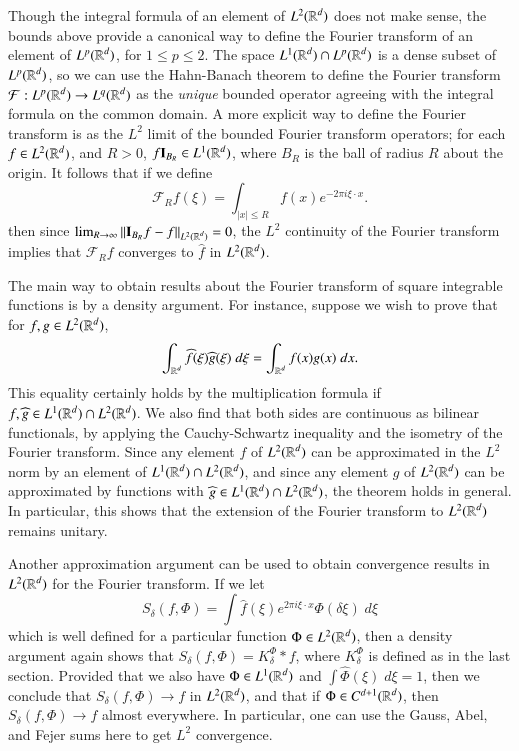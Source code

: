 Though the integral formula of an element of $L^2(\operatorname{\mathbb{R}}^d)$ does not make sense, the bounds above provide a canonical way to define the Fourier transform of an element of $L^p(\operatorname{\mathbb{R}}^d)$, for $1 \leq p \leq 2$. The space $L^1(\operatorname{\mathbb{R}}^d) \cap L^p(\operatorname{\mathbb{R}}^d)$ is a dense subset of $L^p(\operatorname{\mathbb{R}}^d)$, so we can use the Hahn-Banach theorem to define the Fourier transform $\mathcal{F}: L^p(\operatorname{\mathbb{R}}^d) \to L^q(\operatorname{\mathbb{R}}^d)$ as the {\it unique} bounded operator agreeing with the integral formula on the common domain. A more explicit way to define the Fourier transform is as the $L^2$ limit of the bounded Fourier transform operators; for each $f \in L^2(\operatorname{\mathbb{R}}^d)$, and $R > 0$, $f \mathbf{I}_{B_R} \in L^1(\operatorname{\mathbb{R}}^d)$, where $B_R$ is the ball of radius $R$ about the origin. It follows that if we define
%
\[ \mathcal{F}_R f (\xi) = \int_{|x| \leq R} f(x) e^{-2 \pi i \xi \cdot x}. \]
%
then since $\lim_{R \to \infty} \| \mathbf{I}_{B_R} f - f \|_{L^2(\operatorname{\mathbb{R}}^d)} = 0$, the $L^2$ continuity of the Fourier transform implies that $\mathcal{F}_R f$ converges to $\widehat{f}$ in $L^2(\operatorname{\mathbb{R}}^d)$.

The main way to obtain results about the Fourier transform of square integrable functions is by a density argument. For instance, suppose we wish to prove that for $f,g \in L^2(\operatorname{\mathbb{R}}^d)$,
%
\[ \int_{\operatorname{\mathbb{R}}^d} \widehat{f}(\xi) \widehat{g}(\xi)\; d\xi = \int_{\operatorname{\mathbb{R}}^d} f(x) g(x)\; dx. \]
%
This equality certainly holds by the multiplication formula if $f,\widehat{g} \in L^1(\operatorname{\mathbb{R}}^d) \cap L^2(\operatorname{\mathbb{R}}^d)$. We also find that both sides are continuous as bilinear functionals, by applying the Cauchy-Schwartz inequality and the isometry of the Fourier transform. Since any element $f$ of $L^2(\operatorname{\mathbb{R}}^d)$ can be approximated in the $L^2$ norm by an element of $L^1(\operatorname{\mathbb{R}}^d) \cap L^2(\operatorname{\mathbb{R}}^d)$, and since any element $g$ of $L^2(\operatorname{\mathbb{R}}^d)$ can be approximated by functions with $\widehat{g} \in L^1(\operatorname{\mathbb{R}}^d) \cap L^2(\operatorname{\mathbb{R}}^d)$, the theorem holds in general. In particular, this shows that the extension of the Fourier transform to $L^2(\operatorname{\mathbb{R}}^d)$ remains unitary.

Another approximation argument can be used to obtain convergence results in $L^2(\operatorname{\mathbb{R}}^d)$ for the Fourier transform. If we let
%
\[ S_\delta(f,\Phi) = \int \widehat{f}(\xi) e^{2 \pi i \xi \cdot x} \Phi(\delta \xi)\; d\xi \]
%
which is well defined for a particular function $\Phi \in L^2(\operatorname{\mathbb{R}}^d)$, then a density argument again shows that $S_\delta(f,\Phi) = K_\delta^\Phi * f$, where $K_\delta^\Phi$ is defined as in the last section. Provided that we also have $\Phi \in L^1(\operatorname{\mathbb{R}}^d)$ and $\int \widehat{\Phi}(\xi)\; d\xi = 1$, then we conclude that $S_\delta(f,\Phi) \to f$ in $L^2(\operatorname{\mathbb{R}}^d)$, and that if $\Phi \in C^{d+1}(\operatorname{\mathbb{R}}^d)$, then $S_\delta(f,\Phi) \to f$ almost everywhere. In particular, one can use the Gauss, Abel, and Fejer sums here to get $L^2$ convergence.

